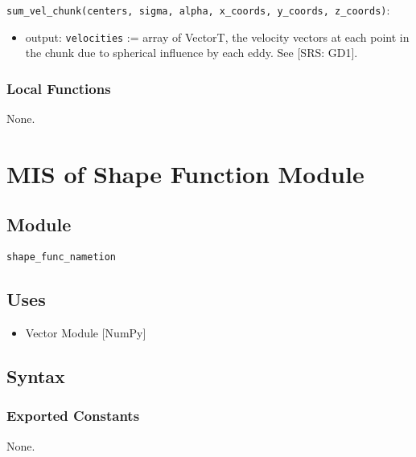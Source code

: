 \documentclass[12pt, titlepage]{article}
\begin{document}
\noindent \texttt{sum\_vel\_chunk(centers, sigma, alpha, x\_coords, y\_coords, z\_coords)}:\\

\begin{itemize}
\item output: \texttt{velocities} := array of VectorT, the velocity vectors at each point in the chunk due to spherical influence by each eddy. See [SRS: GD1].
\end{itemize}

\subsubsection{Local Functions}

None.


\newpage
\section{MIS of Shape Function Module} \label{mShape}

\subsection{Module}
\texttt{shape\_func\_nametion}

\subsection{Uses}
\begin{itemize}
\item Vector Module [NumPy]
\end{itemize}

\subsection{Syntax}

\subsubsection{Exported Constants}
None.
\end{document}
